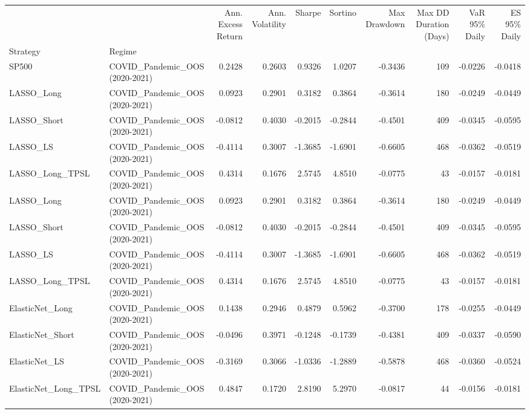 \begin{tabular}{llrrrrrrrr}
\toprule
 &  & Ann. Excess Return & Ann. Volatility & Sharpe & Sortino & Max Drawdown & Max DD Duration (Days) & VaR 95\% Daily & ES 95\% Daily \\
Strategy & Regime &  &  &  &  &  &  &  &  \\
\midrule
SP500 & COVID\_Pandemic\_OOS (2020-2021) & 0.2428 & 0.2603 & 0.9326 & 1.0207 & -0.3436 & 109 & -0.0226 & -0.0418 \\
\cline{1-10}
LASSO\_Long & COVID\_Pandemic\_OOS (2020-2021) & 0.0923 & 0.2901 & 0.3182 & 0.3864 & -0.3614 & 180 & -0.0249 & -0.0449 \\
\cline{1-10}
LASSO\_Short & COVID\_Pandemic\_OOS (2020-2021) & -0.0812 & 0.4030 & -0.2015 & -0.2844 & -0.4501 & 409 & -0.0345 & -0.0595 \\
\cline{1-10}
LASSO\_LS & COVID\_Pandemic\_OOS (2020-2021) & -0.4114 & 0.3007 & -1.3685 & -1.6901 & -0.6605 & 468 & -0.0362 & -0.0519 \\
\cline{1-10}
LASSO\_Long\_TPSL & COVID\_Pandemic\_OOS (2020-2021) & 0.4314 & 0.1676 & 2.5745 & 4.8510 & -0.0775 & 43 & -0.0157 & -0.0181 \\
\cline{1-10}
LASSO\_Long & COVID\_Pandemic\_OOS (2020-2021) & 0.0923 & 0.2901 & 0.3182 & 0.3864 & -0.3614 & 180 & -0.0249 & -0.0449 \\
\cline{1-10}
LASSO\_Short & COVID\_Pandemic\_OOS (2020-2021) & -0.0812 & 0.4030 & -0.2015 & -0.2844 & -0.4501 & 409 & -0.0345 & -0.0595 \\
\cline{1-10}
LASSO\_LS & COVID\_Pandemic\_OOS (2020-2021) & -0.4114 & 0.3007 & -1.3685 & -1.6901 & -0.6605 & 468 & -0.0362 & -0.0519 \\
\cline{1-10}
LASSO\_Long\_TPSL & COVID\_Pandemic\_OOS (2020-2021) & 0.4314 & 0.1676 & 2.5745 & 4.8510 & -0.0775 & 43 & -0.0157 & -0.0181 \\
\cline{1-10}
ElasticNet\_Long & COVID\_Pandemic\_OOS (2020-2021) & 0.1438 & 0.2946 & 0.4879 & 0.5962 & -0.3700 & 178 & -0.0255 & -0.0449 \\
\cline{1-10}
ElasticNet\_Short & COVID\_Pandemic\_OOS (2020-2021) & -0.0496 & 0.3971 & -0.1248 & -0.1739 & -0.4381 & 409 & -0.0337 & -0.0590 \\
\cline{1-10}
ElasticNet\_LS & COVID\_Pandemic\_OOS (2020-2021) & -0.3169 & 0.3066 & -1.0336 & -1.2889 & -0.5878 & 468 & -0.0360 & -0.0524 \\
\cline{1-10}
ElasticNet\_Long\_TPSL & COVID\_Pandemic\_OOS (2020-2021) & 0.4847 & 0.1720 & 2.8190 & 5.2970 & -0.0817 & 44 & -0.0156 & -0.0181 \\

\end{tabular}
